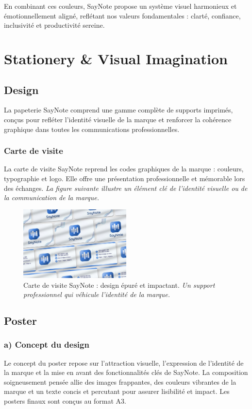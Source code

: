 En combinant ces couleurs, SayNote propose un système visuel harmonieux et émotionnellement aligné, reflétant nos valeurs fondamentales : clarté, confiance, inclusivité et productivité sereine.

\section{Stationery \& Visual Imagination}
\subsection{Design}
La papeterie SayNote comprend une gamme complète de supports imprimés, conçus pour refléter l'identité visuelle de la marque et renforcer la cohérence graphique dans toutes les communications professionnelles.

\subsubsection*{Carte de visite}
La carte de visite SayNote reprend les codes graphiques de la marque : couleurs, typographie et logo. Elle offre une présentation professionnelle et mémorable lors des échanges.
\noindent
\textit{La figure suivante illustre un élément clé de l'identité visuelle ou de la communication de la marque.}
\begin{figure}[H]
    \centering
    \includegraphics[width=0.5\textwidth]{docs/visual-indentity/pictures/card.jpg}
    \caption{Carte de visite SayNote : design épuré et impactant. \newline\textit{Un support professionnel qui véhicule l'identité de la marque.}}
\end{figure}

\subsection{Poster}
\subsubsection*{a) Concept du design}
Le concept du poster repose sur l'attraction visuelle, l'expression de l'identité de la marque et la mise en avant des fonctionnalités clés de SayNote. La composition soigneusement pensée allie des images frappantes, des couleurs vibrantes de la marque et un texte concis et percutant pour assurer lisibilité et impact. Les posters finaux sont conçus au format A3.

